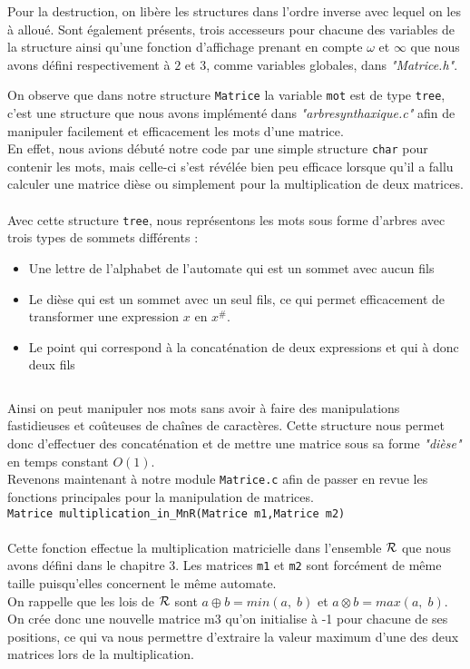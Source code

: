 \documentclass{report}
\begin{document}
Pour la destruction, on libère les structures dans l'ordre inverse avec lequel on les à alloué. Sont également présents, trois accesseurs pour chacune des variables de la structure ainsi qu'une fonction d'affichage prenant en compte $\omega$ et $\infty$ que nous avons défini respectivement à $2$ et $3$, comme variables globales, dans \textit{"Matrice.h"}.

On observe que dans notre structure \verb?Matrice? la variable \verb?mot? est de type \verb?tree?, c'est une structure que nous avons implémenté dans \textit{"arbresynthaxique.c"} afin de manipuler facilement et efficacement les mots d'une matrice.\\
En effet, nous avions débuté notre code par une simple structure \verb?char? pour contenir les mots, mais celle-ci s'est révélée bien peu efficace lorsque qu'il a fallu calculer une matrice dièse ou simplement pour la multiplication de deux matrices. \\\\
Avec cette structure \verb?tree?, nous représentons les mots sous forme d'arbres avec trois types de sommets différents :
\begin{itemize}
\item Une lettre de l'alphabet de l'automate qui est un sommet avec aucun fils
\item Le dièse qui est un sommet avec un seul fils, ce qui permet efficacement de transformer une expression $x$ en $x^{\#}$.
\item Le point qui correspond à la concaténation de deux expressions et qui à donc deux fils
\end{itemize}
$\ $

Ainsi on peut manipuler nos mots sans avoir à faire des manipulations fastidieuses et coûteuses de chaînes de caractères. Cette structure nous permet donc d'effectuer des concaténation et de mettre une matrice sous sa forme \textit{"dièse"} en temps constant $O(1)$.\\

Revenons maintenant à notre module \verb?Matrice.c? afin de passer en revue les fonctions principales pour la manipulation de matrices. \\

\verb?Matrice multiplication_in_MnR(Matrice m1,Matrice m2)?\\\\
Cette fonction effectue la multiplication matricielle dans l'ensemble $\mathcal{R}$ que nous avons défini dans le chapitre 3. Les matrices \verb?m1? et \verb?m2? sont forcément de même taille puisqu'elles concernent le même automate.\\
On rappelle que les lois de $\mathcal{R}$ sont $a \oplus b = min(a,\;b)$ et $a \otimes b = max(a,\;b)$. On crée donc une nouvelle matrice m3 qu'on initialise à -1 pour chacune de ses positions, ce qui va nous permettre d'extraire la valeur maximum d'une des deux matrices lors de la multiplication.\\
\end{document}
